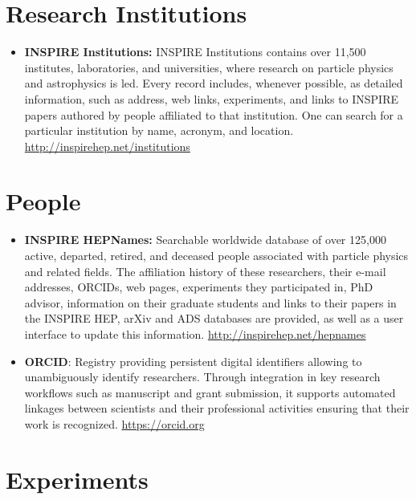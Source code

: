 \section{Research Institutions}\label{databases:sec:research}


\begin{itemize}
\tightlist
{}
\item
  \textbf{INSPIRE Institutions:} INSPIRE Institutions contains over
  11,500 institutes, laboratories, and universities, where research on
  particle physics and astrophysics is led. Every record includes,
  whenever possible, as detailed information, such as address, web
  links, experiments, and links to INSPIRE papers authored by people
  affiliated to that institution. One can search for a particular
  institution by name, acronym, and location.
  \url{http://inspirehep.net/institutions}
\end{itemize}

\section{People}\label{databases:sec:people}

\begin{itemize}
\item
  \textbf{INSPIRE HEPNames:} Searchable worldwide database of over
  125,000 active, departed, retired, and deceased people associated with
  particle physics and related fields. The affiliation history of these
  researchers, their e-mail addresses, ORCIDs, web pages, experiments
  they participated in, PhD advisor, information on their graduate
  students and links to their papers in the INSPIRE HEP, arXiv and ADS
  databases are provided, as well as a user interface to update this
  information. \url{http://inspirehep.net/hepnames}
\item
  \textbf{ORCID}: Registry providing persistent digital identifiers
  allowing to unambiguously identify researchers. Through integration in
  key research workflows such as manuscript and grant submission, it
  supports automated linkages between scientists and their professional
  activities ensuring that their work is recognized.
  \url{https://orcid.org}
\end{itemize}

\section{Experiments}\label{databases:sec:experiments}

